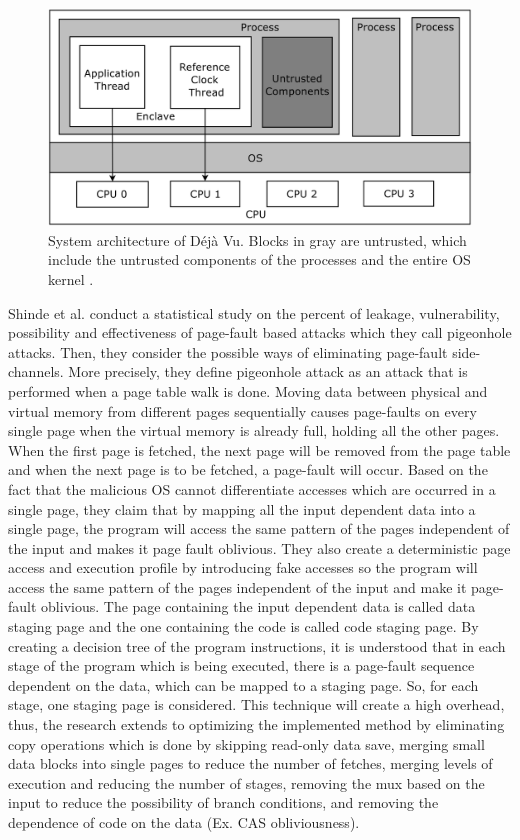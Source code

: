 \begin{figure}
	\includegraphics[scale=0.2]{images/dejavu}
	\caption{System architecture of Déjà Vu. Blocks in gray are untrusted, which include the untrusted components of the processes and the entire OS kernel \cite{dejavu}.}
	\label{fig:dejavu}
\end{figure}

Shinde et al. \cite{pigeonhole} conduct a statistical study on the percent of leakage, vulnerability, possibility and effectiveness of page-fault based attacks which they call pigeonhole attacks. Then, they consider the possible ways of eliminating page-fault side-channels. More precisely, they define pigeonhole attack as an attack that is performed when a page table walk is done. Moving data between physical and virtual memory from different pages sequentially causes page-faults on every single page when the virtual memory is already full, holding all the other pages. When the first page is fetched, the next page will be removed from the page table and when the next page is to be fetched, a page-fault will occur. Based on the fact that the malicious OS cannot differentiate accesses which are occurred in a single page, they claim that by mapping all the input dependent data into a single page, the program will access the same pattern of the pages independent of the input and makes it page fault oblivious. They also create a deterministic page access and execution profile by introducing fake accesses so the program will access the same pattern of the pages independent of the input and make it page-fault oblivious. The page containing the input dependent data is called data staging page and the one containing the code is called code staging page. By creating a decision tree of the program instructions, it is understood that in each stage of the program which is being executed, there is a page-fault sequence dependent on the data, which can be mapped to a staging page. So, for each stage, one staging page is considered. This technique will create a high overhead, thus, the research extends to optimizing the implemented method by eliminating copy operations which is done by skipping read-only data save, merging small data blocks into single pages to reduce the number of fetches, merging levels of execution and reducing the number of stages, removing the mux based on the input to reduce the possibility of branch conditions, and removing the dependence of code on the data (Ex. CAS obliviousness).

